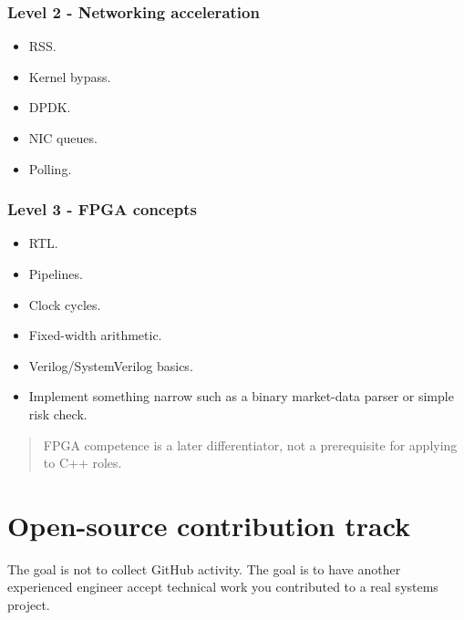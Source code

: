 \documentclass[11pt,letterpaper]{article}
\begin{document}
\subsubsection*{Level 2 - Networking acceleration}

\begin{itemize}

\item RSS.

\item Kernel bypass.

\item DPDK.

\item NIC queues.

\item Polling.

\end{itemize}

\subsubsection*{Level 3 - FPGA concepts}

\begin{itemize}

\item RTL.

\item Pipelines.

\item Clock cycles.

\item Fixed-width arithmetic.

\item Verilog/SystemVerilog basics.

\item Implement something narrow such as a binary market-data parser or simple risk check.

\end{itemize}

\begin{quote}
FPGA competence is a later differentiator, not a prerequisite for applying to C++ roles.
\end{quote}

\section{Open-source contribution track}\label{sec:13}

The goal is not to collect GitHub activity. The goal is to have another experienced engineer accept technical work you contributed to a real systems project.
\end{document}

